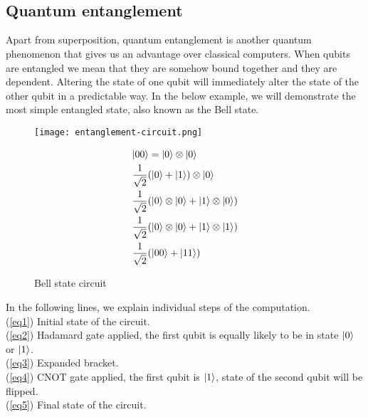 \\
\\
\subsection{Quantum entanglement}
Apart from superposition, quantum entanglement is another quantum phenomenon that gives us an advantage over classical computers. When qubits are entangled we mean that they are somehow bound together and they are dependent. Altering the state of one qubit will immediately alter the state of the other qubit in a predictable way. In the below example, we will demonstrate the most simple entangled state, also known as the Bell state.

\begin{figure}[H]
\begin{minipage}{.35\textwidth}
    \texttt{[image: entanglement-circuit.png]}
    \caption{Bell state circuit}

\end{minipage}
\hfill
\begin{minipage}{.50\textwidth}
  \begin{align} 
             &\lvert00\rangle = \lvert0\rangle \otimes \lvert0\rangle \label{eq1} \\
             &\frac{1}{\sqrt{2}}(\lvert0\rangle + \lvert1\rangle) \otimes \lvert0\rangle \label{eq2}\\
             &\frac{1}{\sqrt{2}}(\lvert0\rangle \otimes \lvert0\rangle + \lvert1\rangle \otimes \lvert0\rangle) \label{eq3} \\
             &\frac{1}{\sqrt{2}}(\lvert0\rangle \otimes \lvert0\rangle + \lvert1\rangle \otimes \lvert1\rangle) \label{eq4}\\
             &\frac{1}{\sqrt{2}}(\lvert00\rangle + \lvert11\rangle) \label{eq5}
  \end{align}
\end{minipage}
\end{figure}

\noindent In the following lines, we explain individual steps of the computation.\\
\noindent (\ref{eq1}) Initial state of the circuit.\\
(\ref{eq2}) Hadamard gate applied, the first qubit is equally likely to be in state $\lvert0\rangle$ or $\lvert1\rangle$.\\
(\ref{eq3}) Expanded bracket.\\
(\ref{eq4}) CNOT gate applied, the first qubit is $\lvert1\rangle$, state of the second qubit will be flipped.\\
(\ref{eq5}) Final state of the circuit.\\

